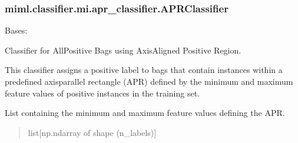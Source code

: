 \documentclass[letterpaper,10pt,english]{sphinxmanual}
\begin{document}
\subsubsection{miml.classifier.mi.apr\_classifier.APRClassifier}
\label{\detokenize{classifier/mi/_autosummary/miml.classifier.mi.apr_classifier.APRClassifier:miml-classifier-mi-apr-classifier-aprclassifier}}\label{\detokenize{classifier/mi/_autosummary/miml.classifier.mi.apr_classifier.APRClassifier::doc}}

\begin{fulllineitems}
\label{\detokenize{classifier/mi/_autosummary/miml.classifier.mi.apr_classifier.APRClassifier:miml.classifier.mi.apr_classifier.APRClassifier}}
\pysigstartsignatures
\pysigline
{}
\pysigstopsignatures
\sphinxAtStartPar
Bases: 

\sphinxAtStartPar
Classifier for All\sphinxhyphen{}Positive Bags using Axis\sphinxhyphen{}Aligned Positive Region.

\sphinxAtStartPar
This classifier assigns a positive label to bags that contain instances within a predefined
axis\sphinxhyphen{}parallel rectangle (APR) defined by the minimum and maximum feature values of positive
instances in the training set.

\begin{fulllineitems}
\label{\detokenize{classifier/mi/_autosummary/miml.classifier.mi.apr_classifier.APRClassifier:miml.classifier.mi.apr_classifier.APRClassifier.apr}}
\pysigstartsignatures
\pysigline
{}
\pysigstopsignatures
\sphinxAtStartPar
List containing the minimum and maximum feature values defining the APR.
\begin{quote}\begin{description}
\sphinxAtStartPar
list{[}np.ndarray of shape (n\_labels){]}

\end{description}\end{quote}

\end{fulllineitems}


\end{fulllineitems}
\end{document}

